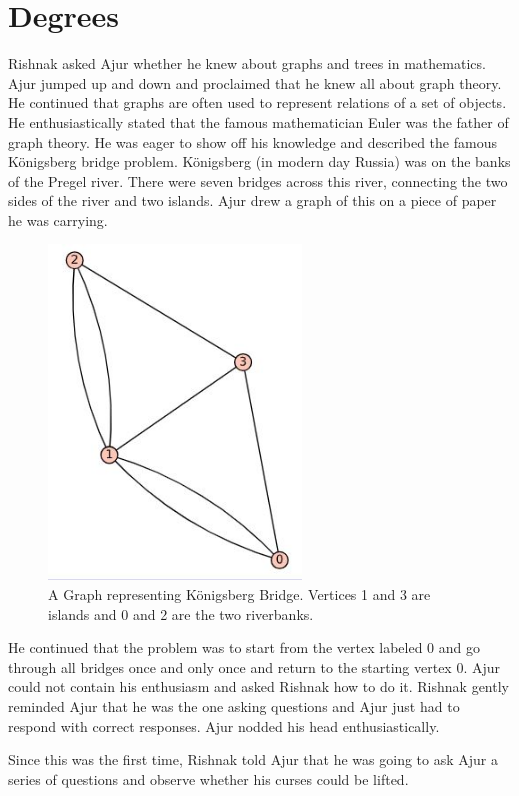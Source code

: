 \chapter{Degrees}
Rishnak asked Ajur whether he knew about graphs and trees in mathematics. Ajur jumped up and down and proclaimed that he knew all about graph theory. He continued that graphs are often used to  represent relations of a set of objects. He enthusiastically stated that the famous mathematician Euler was the father of graph theory. He was eager to show off his knowledge and described the famous  K\"{o}nigsberg bridge problem.  K\"{o}nigsberg (in modern day Russia) was on the banks of the Pregel river.  There were seven bridges across this river, connecting the two sides of the river and two islands. Ajur drew a graph of this on a piece of paper he was carrying.
\begin{figure}
\includegraphics[width=0.6\textwidth]{konigsberg.JPG}
\caption{A Graph representing K\"{o}nigsberg Bridge. Vertices 1 and 3 are islands and 0 and 2 are the two riverbanks.}\label{kon}
\end{figure}

He continued that the problem was to start from the vertex labeled 0 and go through all bridges once and only once and return to the starting vertex 0. Ajur could not contain his enthusiasm and asked Rishnak how to do it. Rishnak gently reminded Ajur that he was the one asking questions and Ajur just had to respond with correct responses. Ajur nodded his head enthusiastically.

 Since this was the first time, Rishnak told Ajur that he was going to ask Ajur a series of questions and observe whether his curses could be lifted.
 
